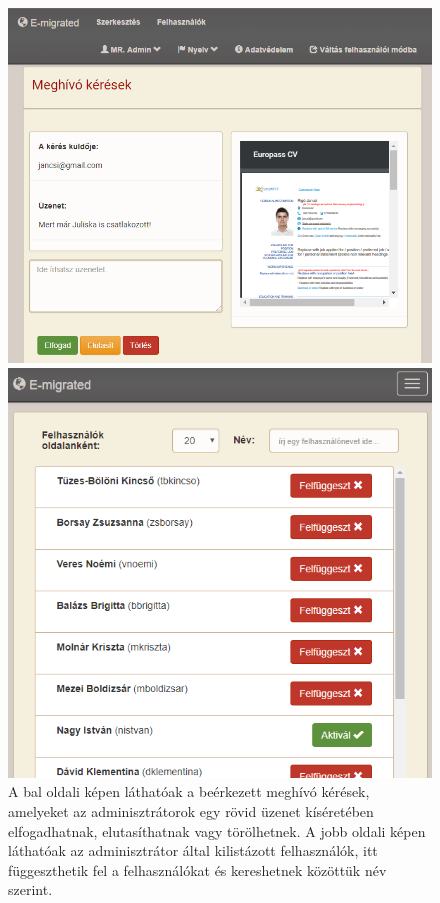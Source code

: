 \begin{figure}[t]
    \centering
    \begin{minipage}{0.49\linewidth}
        \centering
        \includegraphics[height=0.83\linewidth]{images/meghivo_keres_admin}
    \end{minipage}
    \begin{minipage}{0.49\linewidth}
        \centering
        \includegraphics[height=0.83\linewidth]{images/admin_list_user}
    \end{minipage}
    \vspace*{3mm}
    \caption{A bal oldali képen láthatóak a beérkezett meghívó kérések, amelyeket az adminisztrátorok egy rövid üzenet kíséretében elfogadhatnak, elutasíthatnak vagy törölhetnek. A jobb oldali képen láthatóak az adminisztrátor által kilistázott felhasználók, itt függeszthetik fel a felhasználókat és kereshetnek közöttük név szerint. }
    \label{fig:admin}
\end{figure}











